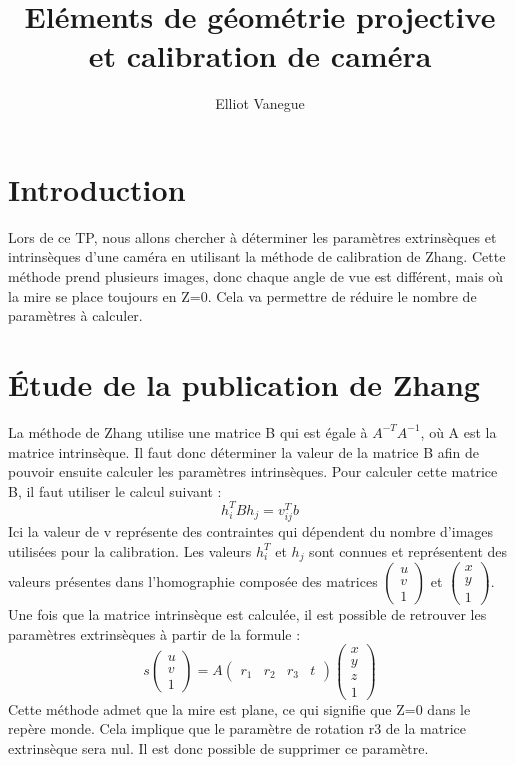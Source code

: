 \documentclass[a4paper,10pt]{article}
\title{Eléments de géométrie projective et calibration de caméra}
\author{Elliot Vanegue}
\begin{document}
\maketitle

\section{Introduction}
Lors de ce TP, nous allons chercher à déterminer les paramètres extrinsèques et 
intrinsèques d'une caméra en utilisant la méthode de calibration de Zhang.
Cette méthode prend plusieurs images, donc chaque angle de vue est différent, mais
où la mire se place toujours en Z=0. Cela va permettre de réduire le nombre de paramètres
à calculer.

\section{Étude de la publication de Zhang}

La méthode de Zhang utilise une matrice B qui est égale à $A^{-T}A^{-1}$, où A est la matrice
intrinsèque. Il faut donc déterminer la valeur de la matrice B afin de pouvoir ensuite 
calculer les paramètres intrinsèques. Pour calculer cette matrice B, il faut utiliser le
calcul suivant : 
\begin{equation}
 h^T_iBh_j=v^T_{ij}b
\end{equation}
Ici la valeur de v représente des contraintes qui dépendent du nombre d'images utilisées pour 
la calibration. Les valeurs $h^T_i$ et $h_j$ sont connues et représentent des valeurs présentes
dans l'homographie composée des matrices $\begin{pmatrix}u\\v\\1\end{pmatrix}$ et $\begin{pmatrix}x\\y\\1\end{pmatrix}$.
Une fois que la matrice intrinsèque est calculée, il
est possible de retrouver les paramètres extrinsèques à partir de la formule :
\begin{equation}
 s\begin{pmatrix}u\\v\\1\end{pmatrix} = A\begin{pmatrix}r_1&r_2&r_3&t\end{pmatrix}\begin{pmatrix}x\\y\\z\\1\end{pmatrix}
\end{equation}
Cette méthode admet que la mire est plane, ce qui signifie que Z=0 dans le repère monde. Cela
implique que le paramètre de rotation r3 de la matrice extrinsèque sera nul. Il est donc
possible de supprimer ce paramètre.\\
\end{document}
